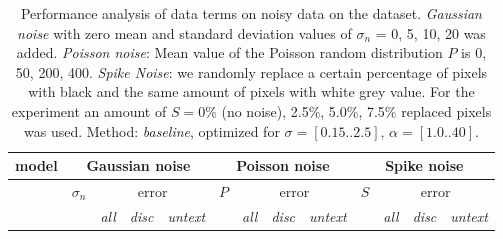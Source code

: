 \begin{table}[htbp] \scriptsize
  \centering
  \caption{Performance analysis of data terms on noisy data on the \rub dataset. \textit{Gaussian noise} with zero mean and standard deviation values of $\sigma_n$ = 0, 5, 10, 20 was added. \textit{Poisson noise}: Mean value of the Poisson random distribution $P$ is 0, 50, 200, 400. \textit{Spike Noise}: we randomly replace a certain percentage of pixels with black and the same amount of pixels with white grey value. For the experiment an amount of $S=$0\% (no noise), 2.5\%, 5.0\%, 7.5\% replaced pixels was used. Method: \textit{baseline}, optimized for $\sigma=[0.15 .. 2.5]$, $\alpha=[1.0 .. 40]$.}
    \begin{tabular}{crrrrrrrrrrrr}
    \toprule
    model & \multicolumn{4}{c}{Gaussian noise} & \multicolumn{4}{c}{Poisson noise} & \multicolumn{4}{c}{Spike noise} \\
    \midrule
          & \multicolumn{1}{c}{$\sigma_n$} & \multicolumn{3}{c}{error} & \multicolumn{1}{c}{$P$} & \multicolumn{3}{c}{error} & \multicolumn{1}{c}{$S$} & \multicolumn{3}{c}{error} \\
          
          \midrule
          
          
          & \multicolumn{1}{c}{} & \multicolumn{1}{c}{\textit{all}} & \multicolumn{1}{c}{\textit{disc}} & \multicolumn{1}{c}{\textit{untext}} & \multicolumn{1}{c}{} & \multicolumn{1}{c}{\textit{all}} & \multicolumn{1}{c}{\textit{disc}} & \multicolumn{1}{c}{\textit{untext}} & \multicolumn{1}{c}{} & \multicolumn{1}{c}{\textit{all}} & \multicolumn{1}{c}{\textit{disc}} & \multicolumn{1}{c}{\textit{untext}} \\
          
          \midrule
          \midrule
          

\end{tabular}
\end{table}
